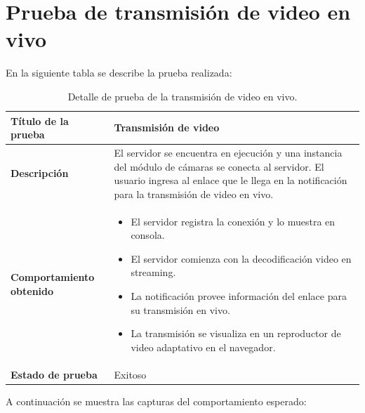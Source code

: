 \section{Prueba de transmisión de video en vivo}

En la siguiente tabla se describe la prueba realizada:\\

\begin{table}[H]
    \caption{Detalle de prueba de la transmisión de video en vivo.}
    \begin{center}
        \begin{tabular}{|>{\centering}p{}|m{}<{\centering}|} 
            \hline
            \textbf{Título de la prueba} & Transmisión de video\\
            \hline
            \textbf{Descripción} & El servidor se encuentra en ejecución y una instancia del módulo de cámaras se conecta al servidor. El usuario ingresa al enlace que le llega en la notificación para la transmisión de video en vivo.\\
            \hline
            \textbf{Comportamiento obtenido} & 
            \begin{itemize}
                \item El servidor registra la conexión y lo muestra en consola.
                \item El servidor comienza con la decodificación video en streaming.
                \item La notificación provee información del enlace para su transmisión en vivo.
                \item La transmisión se visualiza en un reproductor de video adaptativo en el navegador.
            \end{itemize} \\ 
            \hline
            \textbf{Estado de prueba} & Exitoso \\
            \hline
        \end{tabular}
    \end{center}
\end{table}

A continuación se muestra las capturas del comportamiento esperado:\\

